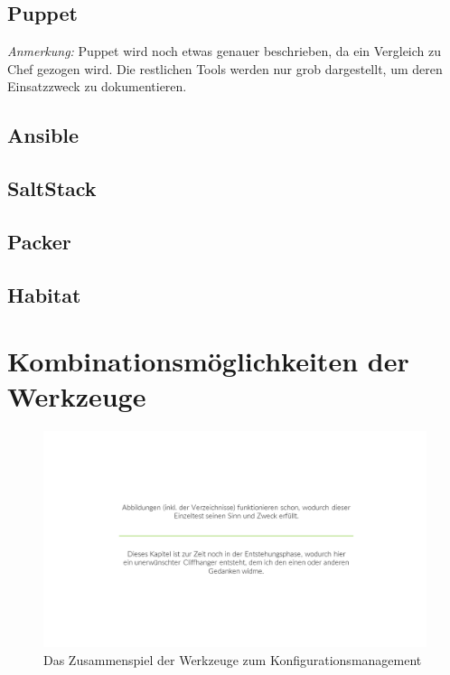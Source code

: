 \subsection{Puppet}
\label{sub:puppet}
\emph{Anmerkung:} Puppet wird noch etwas genauer beschrieben, da ein Vergleich zu Chef gezogen wird. Die restlichen Tools werden nur grob dargestellt, um deren Einsatzzweck zu dokumentieren.

\subsection{Ansible}
\label{sub:ansible}

\subsection{SaltStack}
\label{sub:saltstack}

\subsection{Packer}
\label{sub:packer}

\subsection{Habitat}
\label{sub:habitat}


\section{Kombinationsmöglichkeiten der Werkzeuge}
\label{sec:werkzeugkombinationsmoeglichkeiten}
\begin{figure}[htbp]
    \centering
    \includegraphics[width=0.9\linewidth,trim=190 160 190 160,clip]{images/cliffhanger}
    \caption{Das Zusammenspiel der Werkzeuge zum  Konfigurationsmanagement}
\label{fig:konfigurationsmanagement-kombinationen}
\end{figure}
